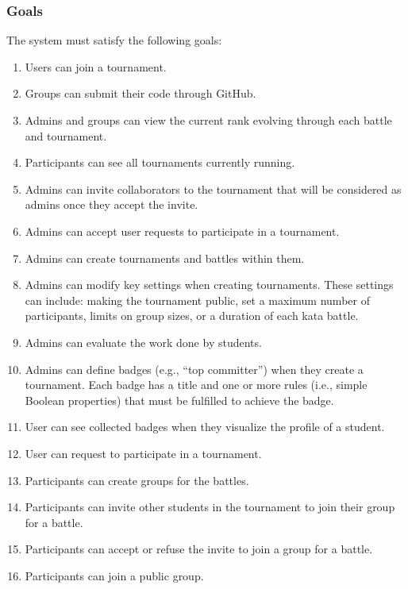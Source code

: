 \documentclass{article}
\begin{document}
            \subsubsection{Goals}
                The system must satisfy the following goals:
                \begin{enumerate}[label=\textbf{G\arabic*}:, left=0pt]
                    \item Users can join a tournament.
                    \item Groups can submit their code through GitHub.
                    \item Admins and groups can view the current rank evolving through each battle and tournament.                    
                    \item Participants can see all tournaments currently running.
                    \item Admins can invite collaborators to the tournament that will be considered as admins once they accept the invite.
                    \item Admins can accept user requests to participate in a tournament.
                    \item Admins can create tournaments and battles within them.
                    \item Admins can modify key settings when creating tournaments. These settings can include:  making  the tournament public, set a maximum number of participants, limits on group sizes, or a  duration of each kata battle. 
                    \item Admins can evaluate the work done by students.
                    \item Admins can define badges (e.g., “top committer”)  when they create a tournament. Each badge has a title and one or more rules (i.e., simple Boolean properties) that must be fulfilled to achieve the badge.
                    \item User can see collected badges when they visualize the profile of a student.
                    \item User can request to participate in a tournament.
                    \item Participants can create groups for the battles.
                    \item Participants can invite other students in the tournament to join their group for a battle.
                    \item Participants can accept or refuse the invite to join a group for a battle.
                    \item Participants can join a public group.
                    
                \end{enumerate}
\end{document}
